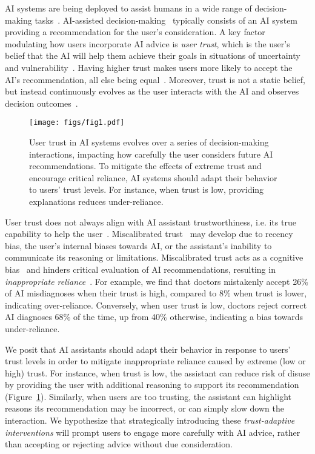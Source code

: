 AI systems are being deployed to assist humans in a wide range of decision-making tasks~\cite{cai2019hello,chiang2023two,che2024integrating}.
AI-assisted decision-making~\cite{lai2023towards} typically consists of an AI system providing a recommendation for the user's consideration. 
A key factor modulating how users incorporate AI advice is \emph{user trust}, which is the user's belief that the AI will help them achieve their goals in situations of uncertainty and vulnerability~\cite{lee2004trust}. 
Having higher trust makes users more likely to accept the AI's recommendation, all else being equal~\cite{dzindolet2003role}. 
Moreover, trust is not a static belief, but instead continuously evolves as the user interacts with the AI and observes decision outcomes~\cite{dhuliawala2023diachronic}.

\begin{figure}[t]
    \centering
    \texttt{[image: figs/fig1.pdf]}
    \caption{User trust in AI systems evolves over a series of decision-making interactions, impacting how carefully the user considers future AI recommendations. To mitigate the effects of extreme trust and encourage critical reliance, AI systems should adapt their behavior to users' trust levels. For instance, when trust is low, providing explanations reduces under-reliance.}
    \label{fig:fig1}
\end{figure}

User trust does not always align with AI assistant trustworthiness, i.e. its true capability to help the user~\cite{wright2010trust}. 
Miscalibrated trust~\cite{jacovi2021formalizing} may develop due to recency bias, the user's internal biases towards AI, or the assistant's inability to communicate its reasoning or limitations. 
Miscalibrated trust acts as a cognitive bias~\cite{lee2024power} and hinders critical evaluation of AI recommendations, resulting in \emph{inappropriate reliance}~\cite{parasuraman1997humans}. 
For example, we find that doctors mistakenly accept 26\% of AI misdiagnoses when their trust is high, compared to 8\% when trust is lower, indicating over-reliance. 
Conversely, when user trust is low, doctors reject correct AI diagnoses 68\% of the time, up from 40\% otherwise, indicating a bias towards under-reliance. 

We posit that AI assistants should adapt their behavior in response to users' trust levels in order to mitigate inappropriate reliance caused by extreme (low or high) trust. 
For instance, when trust is low, the assistant can reduce risk of disuse by providing the user with additional reasoning to support its recommendation (Figure~\ref{fig:fig1}). 
Similarly, when users are too trusting, the assistant can highlight reasons its recommendation may be incorrect, or can simply slow down the interaction. 
We hypothesize that strategically introducing these \emph{trust-adaptive interventions} will prompt users to engage more carefully with AI advice, rather than accepting or rejecting advice without due consideration. 

